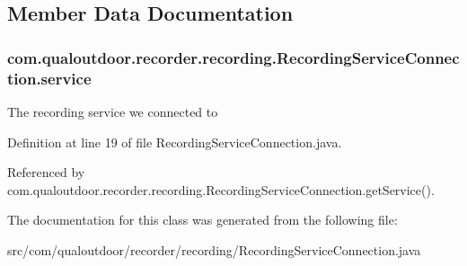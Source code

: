 \subsection{Member Data Documentation}
\hypertarget{classcom_1_1qualoutdoor_1_1recorder_1_1recording_1_1RecordingServiceConnection_a8eb8ebee30e9b3f9264935bc7277ae5e}{
\subsubsection[{service}]{ com.\-qualoutdoor.\-recorder.\-recording.\-Recording\-Service\-Connection.\-service\hspace{0.3cm}{\ttfamily [private]}}}\label{classcom_1_1qualoutdoor_1_1recorder_1_1recording_1_1RecordingServiceConnection_a8eb8ebee30e9b3f9264935bc7277ae5e}
The recording service we connected to 

Definition at line 19 of file Recording\-Service\-Connection.\-java.



Referenced by com.\-qualoutdoor.\-recorder.\-recording.\-Recording\-Service\-Connection.\-get\-Service().



The documentation for this class was generated from the following file\-:\begin{DoxyCompactItemize}
\item 
src/com/qualoutdoor/recorder/recording/Recording\-Service\-Connection.\-java\end{DoxyCompactItemize}

